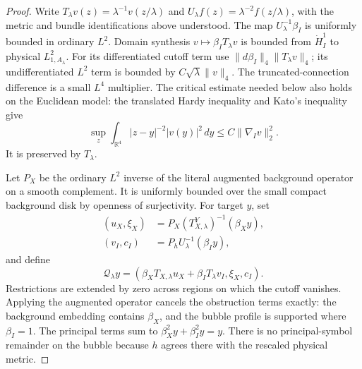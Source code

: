 \documentclass[11pt]{amsart}
\theoremstyle{definition}
\theoremstyle{remark}
\theoremstyle{plain}
\newcommand{\RR}{\mathbb{R}}
\begin{document}
\begin{proof}
Write $T_\lambda v(z)=\lambda^{-1}v(z/\lambda)$ and
$U_\lambda f(z)=\lambda^{-2}f(z/\lambda)$, with the metric and bundle
identifications above understood.  The map $U_\lambda^{-1}\beta_I$
is uniformly bounded in ordinary $L^2$.  Domain synthesis
$v\mapsto\beta_I T_\lambda v$ is bounded from $\dot H_I^1$ to
physical $L^2_{1,A_\lambda}$.  For its differentiated cutoff term use
$\|d\beta_I\|_4\|T_\lambda v\|_4$; its undifferentiated $L^2$
term is bounded by $C\sqrt\lambda\|v\|_4$.
The truncated-connection difference is a small $L^4$ multiplier.
The critical estimate needed below also holds on the Euclidean model:
the translated Hardy inequality and Kato's inequality give
\begin{equation}\label{eq:euclidean-hardy}
 \sup_z\int_{\RR^4}|z-y|^{-2}|v(y)|^2\,dy
 \leq C\|\nabla_Iv\|_2^2.
\end{equation}
It is preserved by $T_\lambda$.

Let $P_X$ be the ordinary $L^2$ inverse of the literal augmented
background operator on a smooth complement.  It is uniformly bounded
over the small compact background disk by openness of surjectivity.
For target $y$, set
\begin{align*}
 (u_X,\xi_X)&=P_X(T^Y_{X,\lambda})^{-1}(\beta_Xy),\\
 (v_I,c_I)&=P_hU_\lambda^{-1}(\beta_Iy),
\end{align*}
and define
\begin{equation}\label{eq:raw-euclidean-parametrix}
 \mathcal Q_\lambda y=(\beta_XT_{X,\lambda}u_X+
                    \beta_IT_\lambda v_I,\xi_X,c_I).
\end{equation}
Restrictions are extended by zero across regions on which the cutoff
vanishes.  Applying the augmented operator cancels the obstruction
terms exactly: the background embedding contains $\beta_X$, and the
bubble profile is supported where $\beta_I=1$.  The principal terms
sum to $\beta_X^2y+\beta_I^2y=y$.  There is no principal-symbol
remainder on the bubble because $h$ agrees there with the rescaled
physical metric.


\end{proof}
\end{document}

